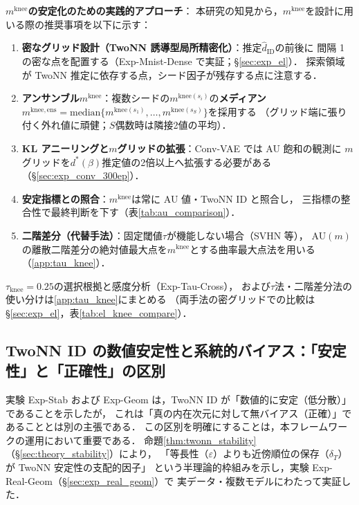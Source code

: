 \documentclass[11pt,a4paper]{jsarticle}
\newcommand{\mknee}{m^{\mathrm{knee}}}
\begin{document}
\textbf{$\mknee$の安定化のための実践的アプローチ}：
本研究の知見から，$\mknee$を設計に用いる際の推奨事項を以下に示す：
\begin{enumerate}
  \item \textbf{密なグリッド設計（TwoNN 誘導型局所精密化）}：推定$\hat{d}_\mathrm{ID}$の前後に
        間隔 1 の密な点を配置する（Exp-Mnist-Dense で実証；§\ref{sec:exp_el}）．
        探索領域が TwoNN 推定に依存する点，シード因子が残存する点に注意する．
  \item \textbf{アンサンブル$\mknee$}：複数シードの$m^{\mathrm{knee}(s_i)}$の\textbf{メディアン}
        $m^{\mathrm{knee,ens}} = \mathrm{median}\{m^{\mathrm{knee}(s_1)}, \ldots, m^{\mathrm{knee}(s_S)}\}$を採用する
        （グリッド端に張り付く外れ値に頑健；$S$偶数時は隣接2値の平均）．
  \item \textbf{KL アニーリングと$m$グリッドの拡張}：Conv-VAE では AU 飽和の観測に
        $m$グリッドを$d^*(\beta)$推定値の2倍以上へ拡張する必要がある（§\ref{sec:exp_conv_300ep}）．
  \item \textbf{安定指標との照合}：$\mknee$は常に AU 値・TwoNN ID と照合し，
        三指標の整合性で最終判断を下す（表\ref{tab:au_comparison}）．
  \item \textbf{二階差分（代替手法）}：固定閾値$\tau$が機能しない場合（SVHN 等），
        AU$(m)$の離散二階差分の絶対値最大点を$\mknee$とする曲率最大点法を用いる（\ref{app:tau_knee}）．
\end{enumerate}

$\tau_{\mathrm{knee}} = 0.25$の選択根拠と感度分析（Exp-Tau-Cross），
および$\tau$法・二階差分法の使い分けは\ref{app:tau_knee}にまとめる
（両手法の密グリッドでの比較は§\ref{sec:exp_el}，表\ref{tab:el_knee_compare}）．

\subsection{TwoNN ID の数値安定性と系統的バイアス：「安定性」と「正確性」の区別}\label{sec:disc_twonn_bias}

実験 Exp-Stab および Exp-Geom は，TwoNN ID が「数値的に安定（低分散）」であることを示したが，
これは「真の内在次元に対して無バイアス（正確）」であることとは別の主張である．
この区別を明確にすることは，本フレームワークの運用において重要である．
命題\ref{thm:twonn_stability}（§\ref{sec:theory_stability}）により，
「等長性（$\varepsilon$）よりも近傍順位の保存（$\delta_T$）が TwoNN 安定性の支配的因子」
という半理論的枠組みを示し，実験 Exp-Real-Geom（§\ref{sec:exp_real_geom}）で
実データ・複数モデルにわたって実証した．
\end{document}
